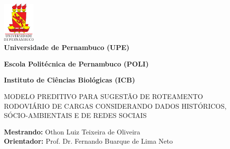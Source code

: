 
\thispagestyle{empty}

\begin{center}

\includegraphics[height=20mm]{Figuras/Capa/brasao_upe.eps}\\


{\textbf{Universidade de Pernambuco (UPE)}}%

{\textbf{Escola Politécnica de Pernambuco (POLI)}}%

{\textbf{Instituto de Ciências Biológicas (ICB)}} \\ \vspace{2ex}

\vspace{1ex}

\vspace{1.3in}

{\Large MODELO PREDITIVO PARA SUGESTÃO DE ROTEAMENTO RODOVIÁRIO DE CARGAS CONSIDERANDO DADOS HISTÓRICOS, SÓCIO-AMBIENTAIS E DE REDES SOCIAIS} \\ 

\vspace{0.3in}


\vspace{1.2ex}

\begin{center}

\vspace{1ex} {\textbf{Mestrando:} Othon Luiz Teixeira de Oliveira \\
	      \textbf{Orientador:} Prof. Dr. Fernando Buarque de Lima Neto }


\end{center}
\end{center}
